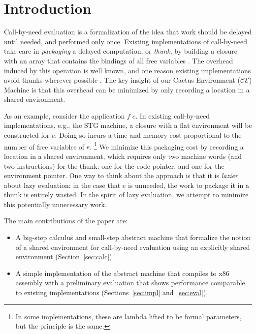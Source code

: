 \section{Introduction}

Call-by-need evaluation is a formalization of the idea that work
should be delayed until needed, and performed only once.  Existing
implementations of call-by-need take care in \emph{packaging} a delayed
computation, or \emph{thunk}, by building a closure with an array that contains
the bindings of all free variables \cite{jonesstg,boquist1997grin}. The overhead
induced by this operation is well known, and one reason existing implementations
avoid thunks wherever possible \cite{johnsson1984efficient}. The key insight of
our Cactus Environment ($\mathcal{CE}$) Machine is that this overhead can be
minimized by only recording a location in a shared environment.

As an example, consider the application $f \; e$. In existing call-by-need
implementations, e.g., the STG machine\cite{jonesstg}, a closure with a flat
environment will be constructed for $e$.  Doing so incurs a time and memory cost
proportional to the number of free variables of $e$. \footnote{In some
implementations, these are lambda lifted to be formal parameters, but the
principle is the same.} We minimize this packaging cost by recording a
location in a shared environment, which requires only two
machine words (and two instructions) for the thunk: one for the code pointer,
and one for the environment pointer. One way to think about the approach is that
it is \emph{lazier} about lazy evaluation: in the case that $e$ is unneeded, the
work to package it in a thunk is entirely wasted. In the spirit of lazy
evaluation, we attempt to minimize this potentially unnecessary work.  

The main contributions of the paper are:
\begin{itemize}
\item A big-step calculus and small-step abstract machine that formalize the
notion of a shared environment for call-by-need evaluation using an explicitly
shared environment (Section~\ref{sec:calc}).
\item A simple implementation of the abstract machine that compiles to x86
assembly with a preliminary evaluation that shows performance comparable to
existing implementations (Sections~\ref{sec:impl} and~\ref{sec:eval}).
\end{itemize}

